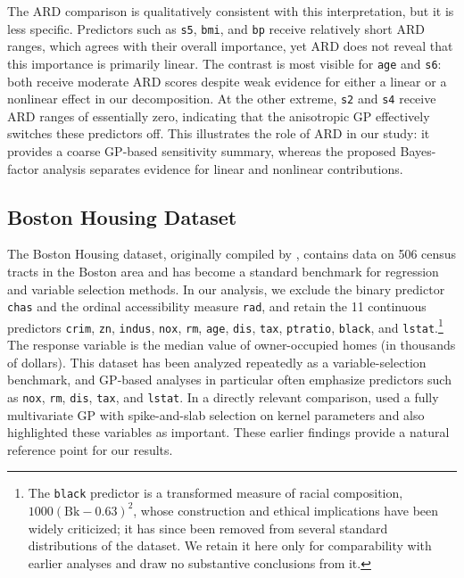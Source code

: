 \documentclass{article}
\begin{document}
The ARD comparison is qualitatively consistent with this interpretation, but it is less specific. Predictors such as \texttt{s5}, \texttt{bmi}, and \texttt{bp} receive relatively short ARD ranges, which agrees with their overall importance, yet ARD does not reveal that this importance is primarily linear. The contrast is most visible for \texttt{age} and \texttt{s6}: both receive moderate ARD scores despite weak evidence for either a linear or a nonlinear effect in our decomposition. At the other extreme, \texttt{s2} and \texttt{s4} receive ARD ranges of essentially zero, indicating that the anisotropic GP effectively switches these predictors off. This illustrates the role of ARD in our study: it provides a coarse GP-based sensitivity summary, whereas the proposed Bayes-factor analysis separates evidence for linear and nonlinear contributions.

\subsection{Boston Housing Dataset}

The Boston Housing dataset, originally compiled by \textcite{harrison1978}, contains data on 506 census tracts in the Boston area and has become a standard benchmark for regression and variable selection methods. In our analysis, we exclude the binary predictor \texttt{chas} and the ordinal accessibility measure \texttt{rad}, and retain the 11 continuous predictors \texttt{crim}, \texttt{zn}, \texttt{indus}, \texttt{nox}, \texttt{rm}, \texttt{age}, \texttt{dis}, \texttt{tax}, \texttt{ptratio}, \texttt{black}, and \texttt{lstat}.\footnote{The \texttt{black} predictor is a transformed measure of racial composition, $1000(\mathrm{Bk}-0.63)^2$, whose construction and ethical implications have been widely criticized; it has since been removed from several standard distributions of the dataset. We retain it here only for comparability with earlier analyses and draw no substantive conclusions from it.} The response variable is the median value of owner-occupied homes (in thousands of dollars). This dataset has been analyzed repeatedly as a variable-selection benchmark, and GP-based analyses in particular often emphasize predictors such as \texttt{nox}, \texttt{rm}, \texttt{dis}, \texttt{tax}, and \texttt{lstat}. In a directly relevant comparison, \textcite{savitsky2011} used a fully multivariate GP with spike-and-slab selection on kernel parameters and also highlighted these variables as important. These earlier findings provide a natural reference point for our results.
\end{document}
